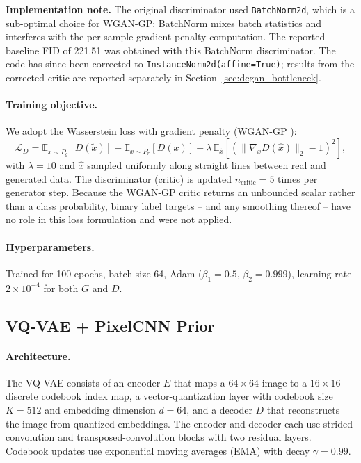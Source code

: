 \documentclass[12pt,a4paper]{article}
\begin{document}
\textbf{Implementation note.}
The original discriminator used \texttt{BatchNorm2d}, which is a sub-optimal
choice for WGAN-GP: BatchNorm mixes batch statistics and interferes with the
per-sample gradient penalty computation.  The reported baseline FID of 221.51
was obtained with this BatchNorm discriminator.  The code has since been
corrected to \texttt{InstanceNorm2d(affine=True)}; results from the corrected
critic are reported separately in Section~\ref{sec:dcgan_bottleneck}.

\paragraph{Training objective.}
We adopt the Wasserstein loss with gradient penalty (WGAN-GP \cite{wgangp}):
\begin{equation}
  \mathcal{L}_D = \mathbb{E}_{\tilde{x}\sim P_g}[D(\tilde{x})]
                - \mathbb{E}_{x\sim P_r}[D(x)]
                + \lambda \, \mathbb{E}_{\hat{x}}
                  \!\left[\left(\|\nabla_{\hat{x}} D(\hat{x})\|_2 - 1\right)^2\right],
\end{equation}
with $\lambda = 10$ and $\hat{x}$ sampled uniformly along straight lines between
real and generated data.  The discriminator (critic) is updated
$n_{\text{critic}} = 5$ times per generator step.  Because the WGAN-GP critic
returns an unbounded scalar rather than a class probability, binary label targets
-- and any smoothing thereof -- have no role in this loss formulation and were
not applied.

\paragraph{Hyperparameters.}
Trained for 100 epochs, batch size 64, Adam ($\beta_1=0.5$, $\beta_2=0.999$),
learning rate $2 \times 10^{-4}$ for both $G$ and $D$.

\subsection{VQ-VAE + PixelCNN Prior}
\label{sec:vqvae}

\paragraph{Architecture.}
The VQ-VAE \cite{vqvae} consists of an encoder $E$ that maps a $64\times64$
image to a $16\times16$ discrete codebook index map, a vector-quantization layer
with codebook size $K=512$ and embedding dimension $d=64$, and a decoder $D$
that reconstructs the image from quantized embeddings.  The encoder and decoder
each use strided-convolution and transposed-convolution blocks with two residual
layers.  Codebook updates use exponential moving averages (EMA) with decay
$\gamma = 0.99$.
\end{document}
